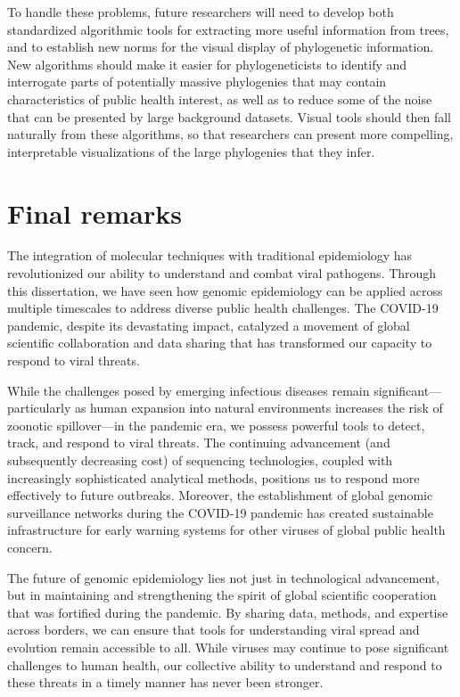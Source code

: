 To handle these problems, future researchers will need to develop both standardized algorithmic tools for extracting more useful information from trees, and to establish new norms for the visual display of phylogenetic information.
New algorithms should make it easier for phylogeneticists to identify and interrogate parts of potentially massive phylogenies that may contain characteristics of public health interest, as well as to reduce some of the noise that can be presented by large background datasets.
Visual tools should then fall naturally from these algorithms, so that researchers can present more compelling, interpretable visualizations of the large phylogenies that they infer.

\section{Final remarks}
The integration of molecular techniques with traditional epidemiology has revolutionized our ability to understand and combat viral pathogens.
Through this dissertation, we have seen how genomic epidemiology can be applied across multiple timescales to address diverse public health challenges.
The COVID-19 pandemic, despite its devastating impact, catalyzed a movement of global scientific collaboration and data sharing that has transformed our capacity to respond to viral threats.

While the challenges posed by emerging infectious diseases remain significant---particularly as human expansion into natural environments increases the risk of zoonotic spillover---in the pandemic era, we possess powerful tools to detect, track, and respond to viral threats.
The continuing advancement (and subsequently decreasing cost) of sequencing technologies, coupled with increasingly sophisticated analytical methods, positions us to respond more effectively to future outbreaks.
Moreover, the establishment of global genomic surveillance networks during the COVID-19 pandemic has created sustainable infrastructure for early warning systems for other viruses of global public health concern.

The future of genomic epidemiology lies not just in technological advancement, but in maintaining and strengthening the spirit of global scientific cooperation that was fortified during the pandemic.
By sharing data, methods, and expertise across borders, we can ensure that tools for understanding viral spread and evolution remain accessible to all.
While viruses may continue to pose significant challenges to human health, our collective ability to understand and respond to these threats in a timely manner has never been stronger.

\cleardoublepage

